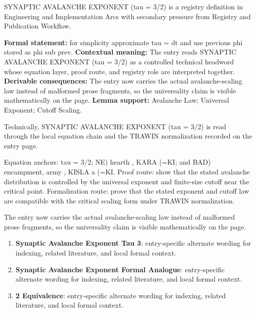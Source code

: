 
\begingroup\small
{}
SYNAPTIC AVALANCHE EXPONENT (tau = 3/2) is a registry definition in Engineering and Implementation Arcs with secondary pressure from Registry and Publication Workflow.

\begingroup\footnotesize\setlength{\emergencystretch}{3em}\sloppy
\textbf{Formal statement:} for simplicity approximate tau = dt and use previous phi stored as phi sub prev. \textbf{Contextual meaning:} The entry reads SYNAPTIC AVALANCHE EXPONENT (tau = 3/2) as a controlled technical headword whose equation layer, proof route, and registry role are interpreted together. \textbf{Derivable consequences:} The entry now carries the actual avalanche-scaling law instead of malformed prose fragments, so the universality claim is visible mathematically on the page. \textbf{Lemma support:} Avalanche Law; Universal Exponent; Cutoff Scaling.\par
\endgroup

Technically, SYNAPTIC AVALANCHE EXPONENT (tau = 3/2) is read through the local equation chain and the TRAWIN normalization recorded on the entry page.

Equation anchors: tau = 3/2; NE) hearth , KARA  (=KI; and BAD) encampment, army , KISLA   a (=KI. Proof route: show that the stated avalanche distribution is controlled by the universal exponent and finite-size cutoff near the critical point. Formalization route: prove that the stated exponent and cutoff law are compatible with the critical scaling form under TRAWIN normalization.

The entry now carries the actual avalanche-scaling law instead of malformed prose fragments, so the universality claim is visible mathematically on the page.
\endgroup

\begin{enumerate}[leftmargin=1.6em,itemsep=6pt,topsep=4pt]
\item \textbf{Synaptic Avalanche Exponent Tau 3}: entry-specific alternate wording for indexing, related literature, and local formal context.
\item \textbf{Synaptic Avalanche Exponent Formal Analogue}: entry-specific alternate wording for indexing, related literature, and local formal context.
\item \textbf{2 Equivalence}: entry-specific alternate wording for indexing, related literature, and local formal context.
\end{enumerate}

